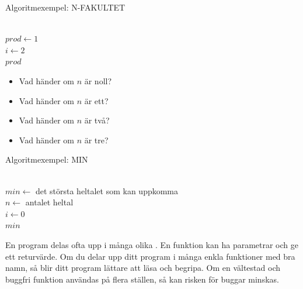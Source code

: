 \fi

\begin{Slide}{Algoritmexempel: N-FAKULTET}
\begin{algorithm}[H]

 ~\\
 $prod \leftarrow 1$ \\
 $i \leftarrow 2$  \\
 $prod$
\end{algorithm}
\pause\vspace{1em}
\begin{itemize}\SlideFontSmall
\item Vad händer om $n$ är noll?
\item Vad händer om $n$ är ett?
\item Vad händer om $n$ är två?
\item Vad händer om $n$ är tre?
\end{itemize}
\end{Slide}

\begin{Slide}{Algoritmexempel: MIN}
\begin{algorithm}[H]

 ~\\
 $min \leftarrow$ det största heltalet som kan uppkomma  \\
 $n \leftarrow $ antalet heltal \\
 $i \leftarrow 0$ \\
 $min$
\end{algorithm}
\end{Slide}



\ifkompendium
\noindent En program delas ofta upp i många olika . En funktion kan ha parametrar och ge ett returvärde. Om du delar upp ditt program i många enkla funktioner med bra namn, så blir ditt program lättare att läsa och begripa. Om en vältestad och buggfri funktion användas på flera ställen, så kan risken för buggar minskas.
\fi 

